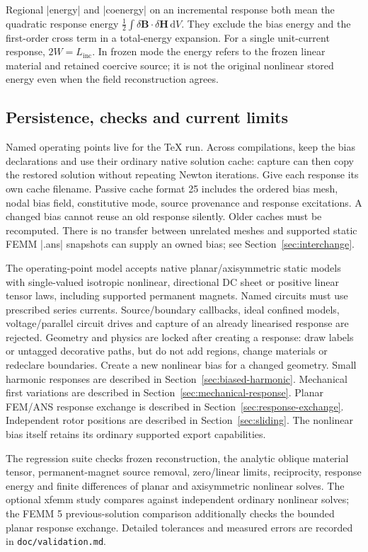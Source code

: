 Regional |energy| and |coenergy| on an incremental response both mean the
quadratic response energy $\tfrac12\int\delta\mathbf B\cdot
\delta\mathbf H\,\mathrm dV$. They exclude the bias energy and the first-order
cross term in a total-energy expansion. For a single unit-current response,
$2W=L_{\mathrm{inc}}$. In frozen mode the energy refers to the frozen linear
material and retained coercive source; it is not the original nonlinear
stored energy even when the field reconstruction agrees.

\subsection{Persistence, checks and current limits}
Named operating points live for the TeX run. Across compilations, keep the
bias declarations and use their ordinary native solution cache: capture can
then copy the restored solution without repeating Newton iterations. Give
each response its own cache filename. Passive cache format 25 includes the
ordered bias mesh, nodal bias field, constitutive mode, source provenance and
response excitations. A changed bias cannot reuse an old response silently.
Older caches must be recomputed. There is no transfer between unrelated meshes
and supported static FEMM |.ans| snapshots can supply an owned bias; see
Section~\ref{sec:interchange}.

The operating-point model accepts native planar/axisymmetric static models with
single-valued isotropic nonlinear, directional DC sheet or positive linear tensor laws, including
supported permanent magnets. Named circuits must use prescribed series
currents. Source/boundary callbacks, ideal confined
models, voltage/parallel circuit drives and capture of an already linearised
response are rejected. Geometry and physics are locked after creating a
response: draw labels or untagged decorative paths, but do not add regions,
change materials or redeclare boundaries. Create a new nonlinear bias for a
changed geometry. Small harmonic responses are described in
Section~\ref{sec:biased-harmonic}. Mechanical first variations are described in
Section~\ref{sec:mechanical-response}. Planar FEM/ANS response exchange is described in
Section~\ref{sec:response-exchange}. Independent rotor positions are described in
Section~\ref{sec:sliding}.
The nonlinear bias itself retains its ordinary supported export capabilities.

The regression suite checks frozen reconstruction, the analytic oblique
material tensor, permanent-magnet source removal, zero/linear limits,
reciprocity, response energy and finite differences of planar and
axisymmetric nonlinear solves. The optional xfemm study compares against
independent ordinary nonlinear solves; the FEMM 5 previous-solution comparison additionally checks the bounded
planar response exchange. Detailed tolerances
and measured errors are recorded in \nolinkurl{doc/validation.md}.

